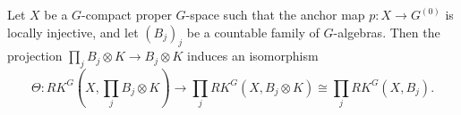 \begin{lem}
Let $X$ be a $G$-compact proper $G$-space such that the anchor map $p:X\rightarrow G^{(0)}$ is locally injective, and let $(B_j)_j$ be a countable family of $G$-algebras. Then the projection $\prod_j B_j \otimes K \rightarrow B_j\otimes K$ induces an isomorphism
\[\Theta : RK^G(X,\prod_j B_j\otimes K)\rightarrow \prod_j RK^G(X,B_j\otimes K)\cong \prod_j RK^G(X,B_j).\]
\label{LocalInjectivity}
\end{lem}


